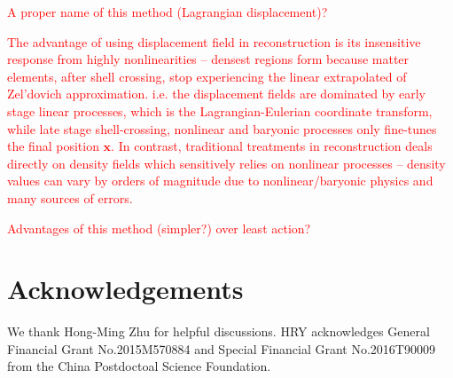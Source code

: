 \documentclass[aps,prd,twocolumn,superscriptaddress,amsfont,amssymb,amsmath,nofootinbib,showpacs,balancelastpage]{revtex4-1}
\newcommand{\bs}{\boldsymbol}
\newcommand{\tcr}{\textcolor{red}}
\begin{document}
\tcr{A proper name of this method (Lagrangian displacement)?}

\tcr{The advantage of using displacement field in reconstruction is
its insensitive response from highly nonlinearities --
densest regions form because matter elements, after shell crossing,
stop experiencing the linear extrapolated of Zel'dovich approximation.
i.e. the displacement fields are dominated by early stage linear processes,
which is the Lagrangian-Eulerian coordinate transform,
while late stage shell-crossing, nonlinear and baryonic processes
only fine-tunes the final position $\bs x$. In contrast, traditional
treatments in reconstruction deals directly on density fields which sensitively
relies on nonlinear processes --  density values can vary by orders
of magnitude due to nonlinear/baryonic physics and many sources of errors.}


\tcr{Advantages of this method (simpler?) over least action?}

\section*{Acknowledgements}
We thank Hong-Ming Zhu for helpful discussions.
HRY acknowledges General Financial Grant No.2015M570884 and Special Financial Grant No.2016T90009 from the China Postdoctoal Science Foundation.

%


\end{document}
